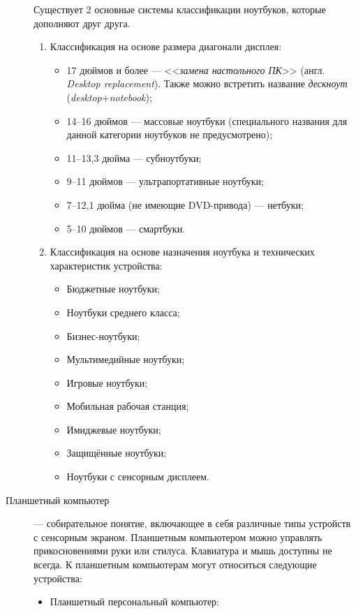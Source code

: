 \begin{description}
  Существует 2 основные системы классификации ноутбуков, которые дополняют друг друга.
  \begin{enumerate}
   \item Классификация на основе размера диагонали дисплея:
         \begin{itemize}
          \item 17 дюймов и более --- <<\emph{замена настольного ПК}>> (англ. \emph{Desktop replacement}). Также можно встретить название \emph{дескноут} (\emph{desktop}$+$\emph{notebook});
          \item 14--16 дюймов --- массовые ноутбуки (специального названия для данной категории ноутбуков не предусмотрено);
          \item 11--13,3 дюйма --- субноутбуки;
          \item 9--11 дюймов --- ультрапортативные ноутбуки;
          \item 7--12,1 дюйма (не имеющие DVD-привода) --- нетбуки;
          \item 5--10 дюймов --- смартбуки.
         \end{itemize}
   \item Классификация на основе назначения ноутбука и технических характеристик устройства:
         \begin{itemize}
          \item Бюджетные ноутбуки;
          \item Ноутбуки среднего класса;
          \item Бизнес-ноутбуки;
          \item Мультимедийные ноутбуки;
          \item Игровые ноутбуки;
          \item Мобильная рабочая станция;
          \item Имиджевые ноутбуки;
          \item Защищённые ноутбуки;
          \item Ноутбуки с сенсорным дисплеем.
         \end{itemize}
  \end{enumerate}
 \item[Планшетный компьютер] --- собирательное понятие, включающее в себя различные типы устройств с сенсорным экраном. Планшетным компьютером можно управлять прикосновениями руки или стилуса. Клавиатура и мышь доступны не всегда.
  К планшетным компьютерам могут относиться следующие устройства:
  \begin{itemize}
   \item Планшетный персональный компьютер:

\end{itemize}
\end{description}
